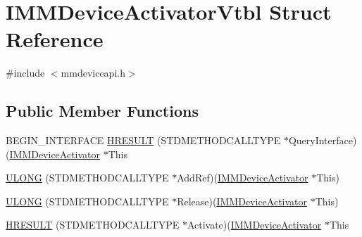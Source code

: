 \hypertarget{struct_i_m_m_device_activator_vtbl}{}\section{I\+M\+M\+Device\+Activator\+Vtbl Struct Reference}
\label{struct_i_m_m_device_activator_vtbl}


{\ttfamily \#include $<$mmdeviceapi.\+h$>$}

\subsection*{Public Member Functions}
\begin{DoxyCompactItemize}
\item 
B\+E\+G\+I\+N\+\_\+\+I\+N\+T\+E\+R\+F\+A\+CE \hyperlink{struct_i_m_m_device_activator_vtbl_ab304b464d4b08177c16ec560f3d9fc3c}{H\+R\+E\+S\+U\+LT} (S\+T\+D\+M\+E\+T\+H\+O\+D\+C\+A\+L\+L\+T\+Y\+PE $\ast$Query\+Interface)(\hyperlink{mmdeviceapi_8h_abb612921f576217a2b218463ce56e00a}{I\+M\+M\+Device\+Activator} $\ast$This
\item 
\hyperlink{struct_i_m_m_device_activator_vtbl_a272a0eca8480353a569dcbd9c97c8076}{U\+L\+O\+NG} (S\+T\+D\+M\+E\+T\+H\+O\+D\+C\+A\+L\+L\+T\+Y\+PE $\ast$Add\+Ref)(\hyperlink{mmdeviceapi_8h_abb612921f576217a2b218463ce56e00a}{I\+M\+M\+Device\+Activator} $\ast$This)
\item 
\hyperlink{struct_i_m_m_device_activator_vtbl_a2b763cf53baa7ad791eb4d060b57d2bf}{U\+L\+O\+NG} (S\+T\+D\+M\+E\+T\+H\+O\+D\+C\+A\+L\+L\+T\+Y\+PE $\ast$Release)(\hyperlink{mmdeviceapi_8h_abb612921f576217a2b218463ce56e00a}{I\+M\+M\+Device\+Activator} $\ast$This)
\item 
\hyperlink{struct_i_m_m_device_activator_vtbl_a5af4203d7708afcbd0cbcdddcf7d1b8d}{H\+R\+E\+S\+U\+LT} (S\+T\+D\+M\+E\+T\+H\+O\+D\+C\+A\+L\+L\+T\+Y\+PE $\ast$Activate)(\hyperlink{mmdeviceapi_8h_abb612921f576217a2b218463ce56e00a}{I\+M\+M\+Device\+Activator} $\ast$This
\end{DoxyCompactItemize}
